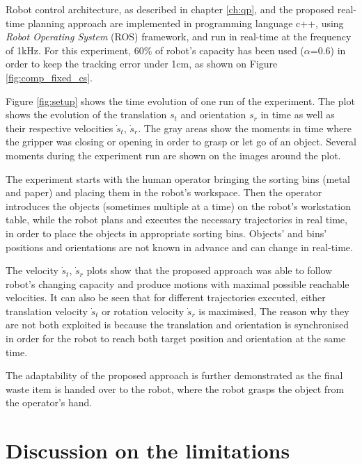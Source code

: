 Robot control architecture, as described in chapter \ref{ch:qp}, and the proposed real-time planning approach are implemented in 
programming language c++, using \textit{Robot Operating System} (ROS) framework, and run in real-time at the frequency of 1kHz. For this experiment, 60\% of robot's capacity has been used ($\alpha$=0.6) in order to keep the tracking error under 1cm, as shown on Figure \ref{fig:comp_fixed_cs}.

Figure \ref{fig:setup} shows the time evolution of one run of the experiment. The plot shows the evolution of the translation $s_t$ and orientation $s_r$ in time as well as their respective velocities  $\dot{s}_t$,  $\dot{s}_r$. The gray areas show the moments in time where the gripper was closing or opening in order to grasp or let go of an object. Several moments during the experiment run are shown on the images around the plot.

The experiment starts with the human operator bringing the sorting bins (metal and paper) and placing them in the robot's workspace. Then the operator introduces the objects (sometimes multiple at a time) on the robot's workstation table, while the robot plans and executes the necessary trajectories in real time, in order to place the objects in appropriate sorting bins. Objects' and bins' positions and orientations are not known in advance and can change in real-time. 

The velocity $\dot{s}_t$, $\dot{s}_r$ plots show that the proposed approach was able to follow robot's changing capacity and produce motions with maximal possible reachable velocities. It can also be seen that for different trajectories executed, either translation velocity $\dot{s}_t$ or rotation velocity $\dot{s}_r$ is maximised, The reason why they are not both exploited is because the translation and orientation is synchronised in order for the robot to reach both target position and orientation at the same time.

The adaptability of the proposed approach is further demonstrated as the final waste item is handed over to the robot, where the robot grasps the object from the operator's hand. 


\section{Discussion on the limitations}
\label{ch:discussion}

